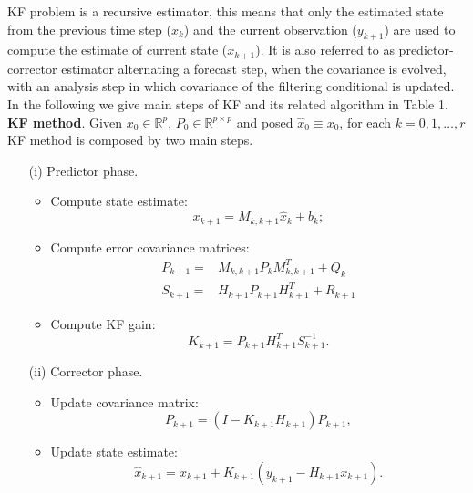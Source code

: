 \noindent KF problem  is a recursive estimator, this means that only the estimated state from the previous time step ($x_{k}$)  and the current observation ($y_{k+1}$) are used to compute the estimate of current state ($x_{k+1}$). It is also referred to as predictor-corrector estimator \cite{sorenson}  alternating a forecast step, when the covariance is evolved, with an analysis step in which  covariance of the filtering conditional is updated. In the following we give main steps of KF and its related algorithm in Table 1.  \\

\noindent \textbf{KF method}. Given ${x}_{0}\in \mathbb{R}^{p}$, $P_{0}\in \mathbb{R}^{p\times p}$ and posed $\widehat{x}_{0}\equiv x_{0}$, for each $k=0,1,\ldots,r$  KF method is composed by two main steps.
\begin{itemize}
\item[(i)] Predictor phase.
\begin{itemize}
\item Compute  state estimate:
\begin{equation}\label{stimapredetta}
x_{k+1}=M_{k,k+1}\widehat{x}_{k}+b_{k};
 \end{equation}
\item Compute  error covariance matrices: 
\begin{eqnarray}\label{predictedmatrix}
P_{k+1}=&M_{k,k+1}P_{k}M_{k,k+1}^{T}+Q_{k}\\ \nonumber
S_{k+1}=&H_{k+1}P_{k+1}H_{k+1}^{T}+R_{k+1} 
\end{eqnarray}
\item Compute  KF gain:
\begin{equation}\label{guadagnodikalman}
K_{k+1}=P_{k+1}H_{k+1}^{T}S_{k+1}^{-1}.
\end{equation}
\end{itemize}
\item[(ii)] Corrector phase.
\begin{itemize}

\item Update  covariance matrix:
\begin{equation}\label{updateP}
P_{k+1}=(I-K_{k+1}H_{k+1})P_{k+1},
\end{equation}
\item Update state estimate:
\begin{equation}\label{stimapredetta1}
\widehat{x}_{k+1}=x_{k+1}+K_{k+1}(y_{k+1}-H_{k+1}x_{k+1}).
\end{equation}
\end{itemize}
\end{itemize}

